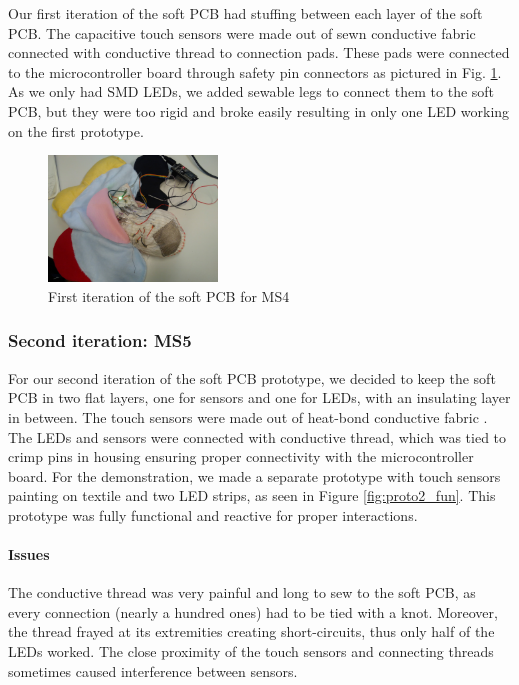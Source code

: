 Our first iteration of the soft PCB had stuffing between each layer of the soft PCB. The capacitive touch sensors were made out of sewn conductive fabric connected with conductive thread to connection pads. These pads were connected to the microcontroller board through safety pin connectors as pictured in Fig. \ref{fig:proto1}. As we only had SMD LEDs, we added sewable legs to connect them to the soft PCB, but they were too rigid and broke easily resulting in only one LED working on the first prototype.


\begin{figure}[ht]
    \centering
    \includegraphics[width=0.4\textwidth, angle=90]{images/HW/proto1_connectors.jpg}
    \caption{First iteration of the soft PCB for MS4}
    \label{fig:proto1}
\end{figure}



\subsubsection{Second iteration: MS5}

For our second iteration of the soft PCB prototype, we decided to keep the soft PCB in two flat layers, one for sensors and one for LEDs, with an insulating layer in between. The touch sensors were made out of heat-bond conductive fabric \cite{heatbond}. The LEDs and sensors were connected with conductive thread, which was tied to crimp pins in housing ensuring proper connectivity with the microcontroller board. 
For the demonstration, we made a separate prototype with touch sensors painting on textile and two LED strips, as seen in Figure \ref{fig:proto2_fun}. This prototype was fully functional and reactive for proper interactions.
\paragraph{Issues}The conductive thread was very painful and long to sew to the soft PCB, as every connection (nearly a hundred ones) had to be tied with a knot. Moreover, the thread frayed at its extremities creating short-circuits, thus only half of the LEDs worked. The close proximity of the touch sensors and connecting threads sometimes caused interference between sensors.
